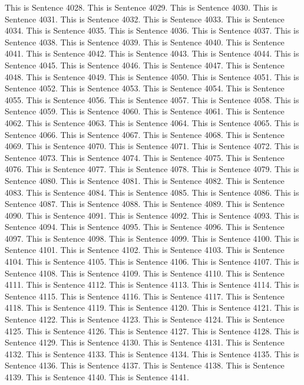 \documentclass{article}
\begin{document}
This is Sentence 4028.
This is Sentence 4029.
This is Sentence 4030.
This is Sentence 4031.
This is Sentence 4032.
This is Sentence 4033.
This is Sentence 4034.
This is Sentence 4035.
This is Sentence 4036.
This is Sentence 4037.
This is Sentence 4038.
This is Sentence 4039.
This is Sentence 4040.
This is Sentence 4041.
This is Sentence 4042.
This is Sentence 4043.
This is Sentence 4044.
This is Sentence 4045.
This is Sentence 4046.
This is Sentence 4047.
This is Sentence 4048.
This is Sentence 4049.
This is Sentence 4050.
This is Sentence 4051.
This is Sentence 4052.
This is Sentence 4053.
This is Sentence 4054.
This is Sentence 4055.
This is Sentence 4056.
This is Sentence 4057.
This is Sentence 4058.
This is Sentence 4059.
This is Sentence 4060.
This is Sentence 4061.
This is Sentence 4062.
This is Sentence 4063.
This is Sentence 4064.
This is Sentence 4065.
This is Sentence 4066.
This is Sentence 4067.
This is Sentence 4068.
This is Sentence 4069.
This is Sentence 4070.
This is Sentence 4071.
This is Sentence 4072.
This is Sentence 4073.
This is Sentence 4074.
This is Sentence 4075.
This is Sentence 4076.
This is Sentence 4077.
This is Sentence 4078.
This is Sentence 4079.
This is Sentence 4080.
This is Sentence 4081.
This is Sentence 4082.
This is Sentence 4083.
This is Sentence 4084.
This is Sentence 4085.
This is Sentence 4086.
This is Sentence 4087.
This is Sentence 4088.
This is Sentence 4089.
This is Sentence 4090.
This is Sentence 4091.
This is Sentence 4092.
This is Sentence 4093.
This is Sentence 4094.
This is Sentence 4095.
This is Sentence 4096.
This is Sentence 4097.
This is Sentence 4098.
This is Sentence 4099.
This is Sentence 4100.
This is Sentence 4101.
This is Sentence 4102.
This is Sentence 4103.
This is Sentence 4104.
This is Sentence 4105.
This is Sentence 4106.
This is Sentence 4107.
This is Sentence 4108.
This is Sentence 4109.
This is Sentence 4110.
This is Sentence 4111.
This is Sentence 4112.
This is Sentence 4113.
This is Sentence 4114.
This is Sentence 4115.
This is Sentence 4116.
This is Sentence 4117.
This is Sentence 4118.
This is Sentence 4119.
This is Sentence 4120.
This is Sentence 4121.
This is Sentence 4122.
This is Sentence 4123.
This is Sentence 4124.
This is Sentence 4125.
This is Sentence 4126.
This is Sentence 4127.
This is Sentence 4128.
This is Sentence 4129.
This is Sentence 4130.
This is Sentence 4131.
This is Sentence 4132.
This is Sentence 4133.
This is Sentence 4134.
This is Sentence 4135.
This is Sentence 4136.
This is Sentence 4137.
This is Sentence 4138.
This is Sentence 4139.
This is Sentence 4140.
This is Sentence 4141.
\end{document}
